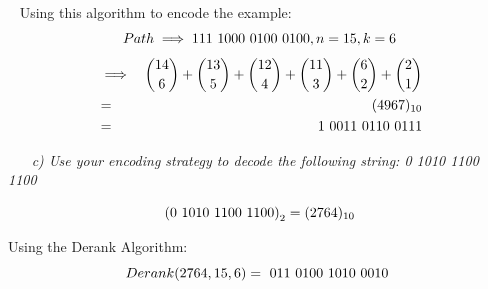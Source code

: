 \documentclass[12pt, letterpaper]{article}
\begin{document}
\-\ \newline \newline
\textnormal{Using this algorithm to encode the example:}
\[ Path \implies \textnormal{111 1000 0100 0100}, n = 15, k = 6 \]
\begin{eqnarray*}
&\implies& {14 \choose 6} + {13 \choose 5} + {12 \choose 4} + {11 \choose 3} + {6 \choose 2} + {2 \choose 1} \\
&=& (4967)_{10} \\
&=& \textnormal{1 0011 0110 0111} \\
\end{eqnarray*}


\-\ \newline \newline
\-\ \it{ c) Use your encoding strategy to decode the following string: 0 1010 1100 1100 }

\[ \textnormal{(0 1010 1100 1100)}_2 = (2764)_{10} \]

\textnormal{Using the Derank Algorithm:}
\[ Derank( 2764, 15, 6 ) = \textnormal{ 011 0100 1010 0010 } \]
\end{document}
